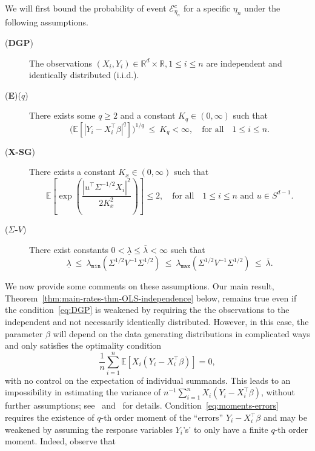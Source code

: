 \documentclass[11pt]{article}
\makeatletter
\def\namedlabel#1#2{\begingroup
    #2%
    \def\@currentlabel{#2}%
    \phantomsection\label{#1}\endgroup
}
\makeatother
\begin{document}
We will first bound the probability of event $\mathcal{E}_{\eta_n}^c$ for a specific $\eta_n$ under the following assumptions. 
\begin{description}
	\item[\namedlabel{eq:DGP}{(\textbf{DGP})}] The observations $(X_i, Y_i)\in\mathbb{R}^d\times\mathbb{R}, 1\le i\le n$ are independent and identically distributed (i.i.d.).
	\item[\namedlabel{eq:moments-errors}{(\textbf{E})($q$)}] There exists some $q \ge 2$ and a constant $K_q\in(0, \infty)$ such that
	\[
	\Big(\mathbb{E}[|Y_i - X_i^{\top}\beta|^q]\Big)^{1/q} ~\le~ K_q < \infty,\quad\mbox{for all}\quad 1\le i\le n. 
	\]
	\item[\namedlabel{eq:covariate-subGaussian}{(\textbf{X-SG})}] There exists a constant $K_x\in(0, \infty)$ such that
	\[
	\mathbb{E}\left[\exp\left(\frac{|u^{\top}\Sigma^{-1/2}X_i|^2}{2K_x^2}\right)\right] \le 2,\quad\mbox{for all}\quad 1\le i\le n\mbox{ and }u\in S^{d-1}.
	\]
	\item[\namedlabel{eq:bounded-asymptotic-variance}{(\textbf{$\Sigma$-$V$})}] There exist constants $0 < \underline{\lambda} \le \overline{\lambda} < \infty$ such that
	\[
	\underline{\lambda} ~\le~ \lambda_{\texttt{min}}(\Sigma^{1/2} V^{-1}\Sigma^{1/2}) ~\le~ \lambda_{\texttt{max}}(\Sigma^{1/2}V^{-1}\Sigma^{1/2}) ~\le~ \overline{\lambda}.
	\]
\end{description}
We now provide some comments on these assumptions. Our main result, Theorem~\ref{thm:main-rates-thm-OLS-independence} below, remains true even if the condition~\ref{eq:DGP} 
is weakened by requiring the the observations to the independent and not necessarily identically distributed.
 However, in this case, the parameter $\beta$ will depend on the data generating distributions in complicated ways and only satisfies the optimality condition
\[
\frac{1}{n}\sum_{i=1}^n \mathbb{E}[X_i(Y_i - X_i^{\top}\beta)] = 0,
\]
with no control on the expectation of individual summands. This leads to an impossibility in estimating the variance of $n^{-1}\sum_{i=1}^n X_i(Y_i - X_i^{\top}\beta)$, without further assumptions; see~\cite{Liu95} and~\citet[Proposition 3.5]{Bac16} for details. Condition~\ref{eq:moments-errors} requires the existence of $q$-th order moment of the ``errors'' $Y_i - X_i^{\top}\beta$ and may be weakened by assuming the response variables $Y_i$'s' to only have a finite $q$-th order moment. Indeed, observe that
\end{document}
